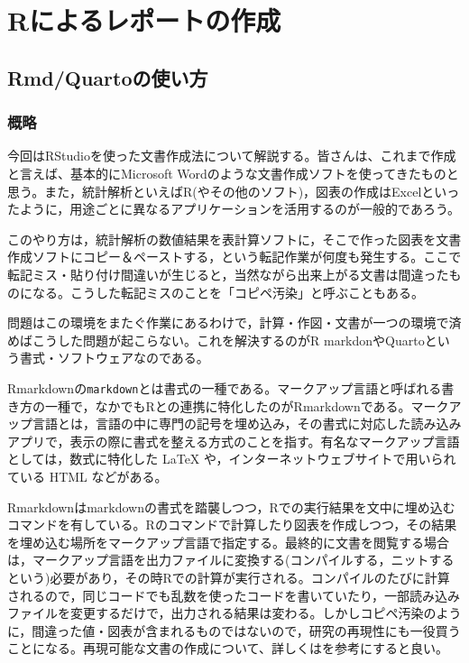\documentclass[
  a4paper,
]{ltjsbook}
\begin{document}

\chapter{Rによるレポートの作成}\label{rux306bux3088ux308bux30ecux30ddux30fcux30c8ux306eux4f5cux6210}

\section{Rmd/Quartoの使い方}\label{rmdquartoux306eux4f7fux3044ux65b9}

\subsection{概略}\label{ux6982ux7565}

今回はRStudioを使った文書作成法について解説する。皆さんは、これまで作成と言えば、基本的にMicrosoft
Wordのような文書作成ソフトを使ってきたものと思う。また，統計解析といえばR(やその他のソフト)，図表の作成はExcelといったように，用途ごとに異なるアプリケーションを活用するのが一般的であろう。

このやり方は，統計解析の数値結果を表計算ソフトに，そこで作った図表を文書作成ソフトにコピー＆ペーストする，という転記作業が何度も発生する。ここで転記ミス・貼り付け間違いが生じると，当然ながら出来上がる文書は間違ったものになる。こうした転記ミスのことを「コピペ汚染」と呼ぶこともある。

問題はこの環境をまたぐ作業にあるわけで，計算・作図・文書が一つの環境で済めばこうした問題が起こらない。これを解決するのがR
markdonやQuartoという書式・ソフトウェアなのである。

Rmarkdownの\texttt{markdown}とは書式の一種である。マークアップ言語と呼ばれる書き方の一種で，なかでもRとの連携に特化したのがRmarkdownである。マークアップ言語とは，言語の中に専門の記号を埋め込み，その書式に対応した読み込みアプリで，表示の際に書式を整える方式のことを指す。有名なマークアップ言語としては，数式に特化した
LaTeX や，インターネットウェブサイトで用いられている HTML などがある。

Rmarkdownはmarkdownの書式を踏襲しつつ，Rでの実行結果を文中に埋め込むコマンドを有している。Rのコマンドで計算したり図表を作成しつつ，その結果を埋め込む場所をマークアップ言語で指定する。最終的に文書を閲覧する場合は，マークアップ言語を出力ファイルに変換する(コンパイルする，ニットするという)必要があり，その時Rでの計算が実行される。コンパイルのたびに計算されるので，同じコードでも乱数を使ったコードを書いていたり，一部読み込みファイルを変更するだけで，出力される結果は変わる。しかしコピペ汚染のように，間違った値・図表が含まれるものではないので，研究の再現性にも一役買うことになる。再現可能な文書の作成について、詳しくは\autocite{Takahashi201805}を参考にすると良い。
\end{document}
